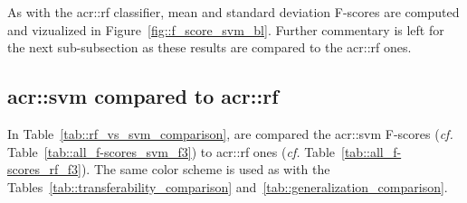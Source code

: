         As with the \gls{acr::rf} classifier, mean and standard deviation F-scores are computed and vizualized in Figure~\ref{fig::f_score_svm_bl}.
        Further commentary is left for the next sub-subsection as these results are compared to the \gls{acr::rf} ones.

        \begin{figure}[htpb]
            \centering
        \end{figure}

    \subsection{\texorpdfstring{\acrshort*{acr::svm}}{SVM} compared to \texorpdfstring{\acrshort*{acr::rf}}{RF}}
        \label{subsec::more_experiments::classifier::svm_rf}
        In Table~\ref{tab::rf_vs_svm_comparison}, are compared the \gls{acr::svm} F-scores (\textit{cf.} Table~\ref{tab::all_f-scores_svm_f3}) to \gls{acr::rf} ones (\textit{cf.} Table~\ref{tab::all_f-scores_rf_f3}).
        The same color scheme is used as with the Tables~\ref{tab::transferability_comparison} and~\ref{tab::generalization_comparison}.\\

